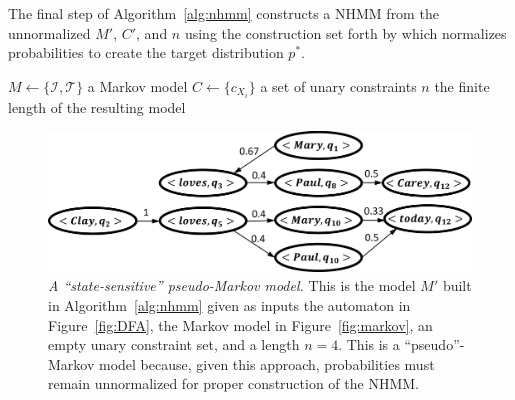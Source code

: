 \documentclass[phd,electronic,oneside,twosidetoc,letterpaper,chaptercenter,parttop,lol,lof,lot]{byumsphd}
\begin{document}
The final step of Algorithm~\ref{alg:nhmm} constructs a NHMM from the unnormalized $M'$, $C'$, and $n$ using the construction set forth by \cite{pachet2011finite} which normalizes probabilities to create the target distribution $p^*$.

\newcommand{\gbfsa}{\ensuremath{\mbox{\sc Regular NHMM}}}
\renewcommand{\algorithmicrequire}{\textbf{Data:}}
\renewcommand{\algorithmicensure}{\textbf{Result:}}
\begin{algorithm}
\caption{$\gbfsa$}\label{alg:nhmm} 
\begin{algorithmic}
{}\newline
$M \leftarrow \{\mathcal{I},\mathcal{T}\}$ a Markov model \newline
$C \leftarrow \{c_{X_i}\}$ a set of unary constraints \newline
$n$ the finite length of the resulting model
 \newline
{} 
	 
\EndFor
	 
	\EndFor
\EndFor
{} 
\EndFor
{}
\end{algorithmic}
\end{algorithm}

\begin{figure}
    \centering
    \includegraphics[width=\linewidth]{ssMarkov}
    \caption{\textit{A ``state-sensitive'' pseudo-Markov model.} This is the model $M'$ built in Algorithm~\ref{alg:nhmm} given as inputs the automaton in Figure~\ref{fig:DFA}, the Markov model in Figure~\ref{fig:markov}, an empty unary constraint set, and a length $n=4$. This is a ``pseudo''-Markov model because, given this approach, probabilities must remain unnormalized for proper construction of the NHMM.}
    \label{fig:ssMarkov}
\end{figure}
\end{document}
